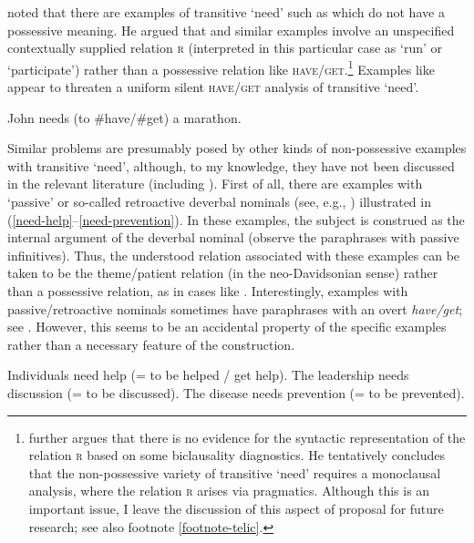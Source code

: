 \documentclass[output=paper]{langscibook}
\begin{document}
\citet{Schwarz2006} noted that there are examples of transitive `need' such as  which do not have a possessive meaning. He argued that  and similar examples involve an unspecified contextually supplied relation \textsc{r} (interpreted in this particular case as `run' or `participate') rather than a possessive relation like \textsc{have/get}.\footnote{\citet{Schwarz2006} further argues that there is no evidence for the syntactic representation of the relation \textsc{r} based on some biclausality diagnostics. He tentatively concludes that the non-possessive variety of transitive `need' requires a monoclausal analysis, where the relation \textsc{r} arises via pragmatics. Although this is an important issue, I leave the discussion of this aspect of  proposal for future research; see also footnote \ref{footnote-telic}.\label{footnote-pragmatic}} Examples like  appear to threaten a uniform silent \textsc{have/get} analysis of transitive `need'.

\ea John needs (to \#have/\#get) a marathon.\hfill \citep[272]{Schwarz2006} \label{marathon}
\z

\noindent Similar problems are presumably posed by other kinds of non-possessive examples with transitive `need', although, to my knowledge, they have not been discussed in the relevant literature (including \citealt{Schwarz2006}). First of all, there are examples with `passive' or so-called retroactive deverbal nominals (see, e.g., \citealt{Safir1991,Roeper2000}) illustrated in (\ref{need-help}--\ref{need-prevention}). In these examples, the subject is construed as the internal argument of the deverbal nominal (observe the paraphrases with passive infinitives). Thus, the understood relation associated with these examples can be taken to be the theme/patient relation (in the neo-Davidsonian sense) rather than a possessive relation, as in cases like . Interestingly, examples with passive/retroactive nominals sometimes have paraphrases with an overt \textit{have/get}; see . However, this seems to be an accidental property of the specific examples rather than a necessary feature of the construction.

\ea\label{retroactive}
\ea Individuals need help (= to be helped / get help).\label{need-help}
\ex The leadership needs discussion (= to be discussed).
\ex The disease needs prevention (= to be prevented).\label{need-prevention} \hfill \citep[306]{Roeper2000}
\z \z
\end{document}
